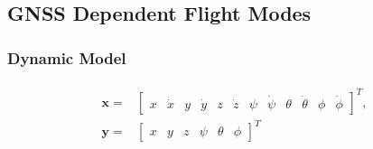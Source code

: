 \subsection{GNSS Dependent Flight Modes}

\subsubsection{Dynamic Model}
\begin{align}
\begin{split}
\mathbf{x} = & \begin{bmatrix}
x & \dot{x} & y & \dot{y} & z & \dot{z} & \psi & \dot{\psi} & \theta & \dot{\theta} & \phi & \dot{\phi}
\end{bmatrix}^{T},\\[15px]
\mathbf{y} = & \begin{bmatrix}
x & y & z & \psi & \theta & \phi
\end{bmatrix}^{T}
\end{split}
\end{align}

